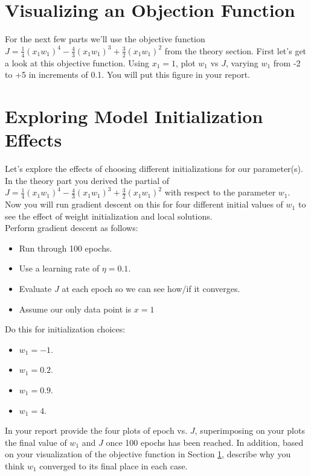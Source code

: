 \documentclass[12pt]{article}
\begin{document}
\newpage
\section{Visualizing an Objection Function}\label{vof}
For the next few parts we'll use the objective function $J=\frac{1}{4}(x_1 w_1)^4-\frac{4}{3}(x_1 w_1)^3+\frac{3}{2}(x_1 w_1)^2$ from the theory section.  First let's get a look at this objective function.  Using $x_1=1$, plot $w_1$ vs $J$, varying $w_1$ from -2 to +5 in increments of 0.1.  You will put this figure in your report.


\section{Exploring Model Initialization Effects}
Let's explore the effects of choosing different initializations for our parameter(s).  In the theory part you derived the partial of $J=\frac{1}{4}(x_1 w_1)^4-\frac{4}{3}(x_1 w_1)^3+\frac{3}{2}(x_1 w_1)^2$ with respect to the parameter $w_1$.  Now you will run gradient descent on this for four different initial values of $w_1$ to see the effect of weight initialization and local solutions.\\  

\noindent
Perform gradient descent as follows:
\begin{itemize}
\item Run through 100 epochs.
\item Use a learning rate of $\eta=0.1$.
\item Evaluate $J$ at each epoch so we can see how/if it converges.
\item Assume our only data point is $x=1$
\end{itemize}

\noindent
Do this for initialization choices:
\begin{itemize}
\item $w_1=-1$.
\item $w_1=0.2$.
\item $w_1=0.9$.
\item $w_1=4$.
\end{itemize} 

\noindent
In your report provide the four plots of epoch vs. $J$, superimposing on your plots the final value of $w_1$ and $J$ once 100 epochs has been reached.  In addition, based on your visualization of the objective function in Section \ref{vof}, describe why you think $w_1$ converged to its final place in each case.
\end{document}

